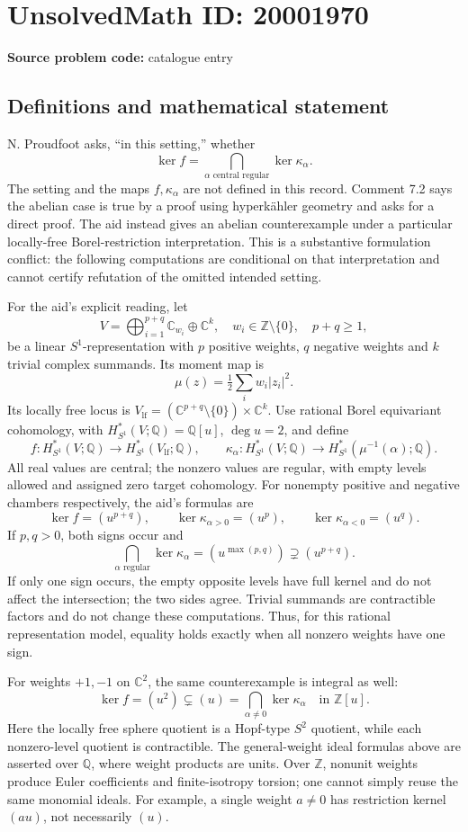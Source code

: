 \documentclass[11pt]{article}
\newcommand{\Z}{\mathbb{Z}}
\newcommand{\Q}{\mathbb{Q}}
\newcommand{\C}{\mathbb{C}}
\begin{document}
\section*{UnsolvedMath ID: 20001970}
\textbf{Source problem code:} catalogue entry
\subsection{Definitions and mathematical statement}
N. Proudfoot asks, ``in this setting,'' whether
\[
 \ker f=\bigcap_{\alpha\text{ central regular}}\ker\kappa_\alpha.
\]
The setting and the maps \(f,\kappa_\alpha\) are not defined in this record. Comment 7.2 says the abelian case is true by a proof using hyperkähler geometry and asks for a direct proof. The aid instead gives an abelian counterexample under a particular locally-free Borel-restriction interpretation. This is a substantive formulation conflict: the following computations are conditional on that interpretation and cannot certify refutation of the omitted intended setting.

For the aid's explicit reading, let
\[
 V=\bigoplus_{i=1}^{p+q}\C_{w_i}\oplus\C^k,
 \quad w_i\in\Z\setminus\{0\},\quad p+q\geq1,
\]
be a linear \(S^1\)-representation with \(p\) positive weights, \(q\) negative weights and \(k\) trivial complex summands. Its moment map is
\[
 \mu(z)=\tfrac12\sum_iw_i|z_i|^2.
\]
Its locally free locus is
\(V_{\mathrm{lf}}=(\C^{p+q}\setminus\{0\})\times\C^k\).
Use rational Borel equivariant cohomology, with
\(H^*_{S^1}(V;\Q)=\Q[u]\), \(\deg u=2\), and define
\[
 f:H^*_{S^1}(V;\Q)\to H^*_{S^1}(V_{\mathrm{lf}};\Q),
 \qquad
 \kappa_\alpha:H^*_{S^1}(V;\Q)
 \to H^*_{S^1}(\mu^{-1}(\alpha);\Q).
\]
All real values are central; the nonzero values are regular, with empty levels allowed and assigned zero target cohomology. For nonempty positive and negative chambers respectively, the aid's formulas are
\[
 \ker f=(u^{p+q}),\qquad
 \ker\kappa_{\alpha>0}=(u^p),\qquad
 \ker\kappa_{\alpha<0}=(u^q).
\]
If \(p,q>0\), both signs occur and
\[
 \bigcap_{\alpha\text{ regular}}\ker\kappa_\alpha
 =(u^{\max(p,q)})\supsetneq(u^{p+q}).
\]
If only one sign occurs, the empty opposite levels have full kernel and do not affect the intersection; the two sides agree. Trivial summands are contractible factors and do not change these computations. Thus, for this rational representation model, equality holds exactly when all nonzero weights have one sign.

For weights \(+1,-1\) on \(\C^2\), the same counterexample is integral as well:
\[
 \ker f=(u^2)\subsetneq(u)
 =\bigcap_{\alpha\ne0}\ker\kappa_\alpha
 \quad\text{in }\Z[u].
\]
Here the locally free sphere quotient is a Hopf-type \(S^2\) quotient, while each nonzero-level quotient is contractible. The general-weight ideal formulas above are asserted over \(\Q\), where weight products are units. Over \(\Z\), nonunit weights produce Euler coefficients and finite-isotropy torsion; one cannot simply reuse the same monomial ideals. For example, a single weight \(a\ne0\) has restriction kernel \((au)\), not necessarily \((u)\).
\end{document}
